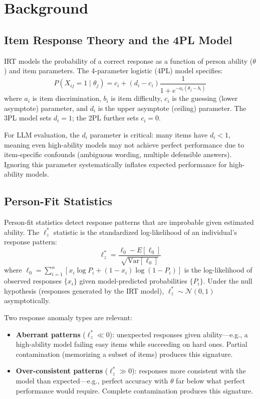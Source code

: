 \documentclass[11pt,a4paper]{article}
\begin{document}
\section{Background}

\subsection{Item Response Theory and the 4PL Model}

IRT models the probability of a correct response as a function of person ability ($\theta$) and item parameters.
The 4-parameter logistic (4PL) model specifies:
\begin{equation}
P(X_{ij}=1 \mid \theta_j) = c_i + (d_i - c_i) \frac{1}{1 + e^{-a_i(\theta_j - b_i)}}
\label{eq:4pl}
\end{equation}
where $a_i$ is item discrimination, $b_i$ is item difficulty, $c_i$ is the guessing (lower asymptote) parameter, and $d_i$ is the upper asymptote (ceiling) parameter.
The 3PL model sets $d_i=1$; the 2PL further sets $c_i=0$.

For LLM evaluation, the $d_i$ parameter is critical: many items have $d_i < 1$, meaning even high-ability models may not achieve perfect performance due to item-specific confounds (ambiguous wording, multiple defensible answers).
Ignoring this parameter systematically inflates expected performance for high-ability models.

\subsection{Person-Fit Statistics}

Person-fit statistics detect response patterns that are improbable given estimated ability.
The $\ell_z^*$ statistic \citep{snijders2001item} is the standardized log-likelihood of an individual's response pattern:
\begin{equation}
\ell_z^* = \frac{\ell_0 - E[\ell_0]}{\sqrt{\text{Var}[\ell_0]}}
\label{eq:lzstar}
\end{equation}
where $\ell_0 = \sum_{i=1}^{n} [x_i \log P_i + (1-x_i) \log(1-P_i)]$ is the log-likelihood of observed responses $\{x_i\}$ given model-predicted probabilities $\{P_i\}$.
Under the null hypothesis (responses generated by the IRT model), $\ell_z^* \sim \mathcal{N}(0,1)$ asymptotically.

Two response anomaly types are relevant:
\begin{itemize}
\item \textbf{Aberrant patterns} ($\ell_z^* \ll 0$): unexpected responses given ability---e.g., a high-ability model failing easy items while succeeding on hard ones. Partial contamination (memorizing a subset of items) produces this signature.
\item \textbf{Over-consistent patterns} ($\ell_z^* \gg 0$): responses more consistent with the model than expected---e.g., perfect accuracy with $\theta$ far below what perfect performance would require. Complete contamination produces this signature.
\end{itemize}
\end{document}
